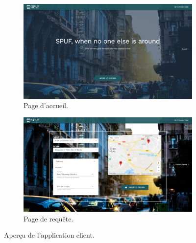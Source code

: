 \begin{figure}

	 \begin{subfigure}[b]{\linewidth}
	 	\includegraphics[width=\linewidth]{img/spuf/acceuil.png}
	 	\caption{Page d'accueil.}
	 \end{subfigure}
	 
	 \begin{subfigure}[b]{\linewidth}
	 	\includegraphics[width=\linewidth]{img/spuf/request.png}
	 	\caption{Page de requête.}	 
	 \end{subfigure}
	 
	\caption{Aperçu de l'application client.}

\end{figure}


